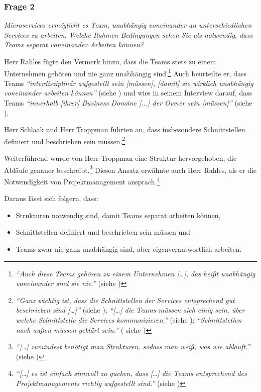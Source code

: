 \subsubsection{Frage 2}
\label{sec:frage2}

\textit{Microservices ermöglicht es Team, unabhängig voneinander an unterschiedlichen Services zu arbeiten. Welche Rahmen Bedingungen sehen Sie als notwendig, dass Teams separat voneinander Arbeiten können?}

Herr Rahles fügte den Vermerk hinzu, dass die Teams stets zu einem Unternehmen gehören und nie ganz unabhängig sind.\footnote{
\textit{\enquote{Auch diese Teams gehören zu einem Unternehmen […], das heißt unabhängig voneinander sind sie nie.}} (siehe )
}
Auch beurteilte er, dass Teams \textit{\enquote{interdisziplinär aufgestellt sein [müssen], [damit] sie wirklich unabhängig voneinander arbeiten können}} (siehe ) und wies in seinem Interview darauf, dass Teams \textit{\enquote{innerhalb [ihrer] Business Domäne [...] der Owner sein [müssen]}} (siehe ).

Herr Schlaak und Herr Troppman führten an, dass insbesondere Schnittstellen definiert und beschrieben sein müssen.\footnote{
\textit{\enquote{Ganz wichtig ist, dass die Schnittstellen der Services entsprechend gut beschrieben sind […]}} (siehe ); \textit{\enquote{[…] die Teams müssen sich einig sein, über welche Schnittstelle die Services kommunizieren.}} (siehe ); \textit{\enquote{Schnittstellen nach außen müssen geklärt sein.}} ( siehe )
}

Weiterführend wurde von Herr Troppman eine Struktur hervorgehoben, die Abläufe genauer beschreibt.\footnote{
\textit{\enquote{[…] zumindest benötigt man Strukturen, sodass man weiß, was wie abläuft.}} (siehe )
} Diesen Ansatz erwähnte auch Herr Rahles, als er die Notwendigkeit von Projektmanagement ansprach.\footnote{
\textit{\enquote{[…] es ist einfach sinnvoll zu gucken, dass […] die Teams entsprechend des Projektmanagements richtig aufgestellt sind.}} (siehe )
}

Daraus lässt sich folgern, dass:
\begin{itemize}
	\item  Strukturen notwendig sind, damit Teams separat arbeiten können,
	\item Schnittstellen definiert und beschrieben sein müssen und
	\item Teams zwar nie ganz unabhängig sind, aber eigenverantwortlich arbeiten.
\end{itemize}

